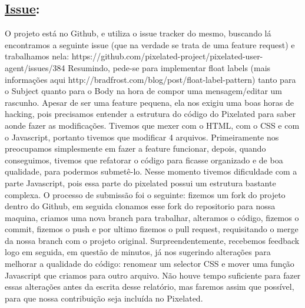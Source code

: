\subsection*{\underline{Issue}:}
O projeto está no Github, e utiliza o issue tracker do mesmo, buscando lá encontramos a seguinte issue (que na verdade se trata de uma feature request) e trabalhamos nela: https://github.com/pixelated-project/pixelated-user-agent/issues/384
Resumindo, pede-se para implementar float labels (mais informações aqui http://bradfrost.com/blog/post/float-label-pattern) tanto para o Subject quanto para o Body na hora de compor uma mensagem/editar um rascunho.
Apesar de ser uma feature pequena, ela nos exigiu uma boas horas de hacking, pois precisamos entender a estrutura do código do Pixelated para saber aonde fazer as modificações.
    Tivemos que mexer com o HTML, com o CSS e com o Javascript, portanto tivemos que modificar 4 arquivos.
Primeiramente nos preocupamos simplesmente em fazer a feature funcionar, depois, quando conseguimos, tivemos que refatorar o código para ficasse organizado e de boa qualidade, para podermos submetê-lo. Nesse momento tivemos dificuldade com a parte Javascript, pois essa parte do pixelated possui um estrutura bastante complexa.
O processo de submissão foi o seguinte: fizemos um fork do projeto dentro do Github, em seguida clonamos esse fork do repositorio para nossa maquina, criamos uma nova branch para trabalhar, alteramos o código, fizemos o commit, fizemos o push e por ultimo fizemos o pull request, requisitando o merge da nossa branch com o projeto original.
Surpreendentemente, recebemos feedback logo em seguida, em questão de minutos, já nos sugerindo alterações para melhorar a qualidade do código: renomear um selector CSS e mover uma função Javascript que criamos para outro arquivo.
    Não houve tempo suficiente para fazer essas alterações antes da escrita desse relatório, mas faremos assim que possível, para que nossa contribuição seja incluída no Pixelated.